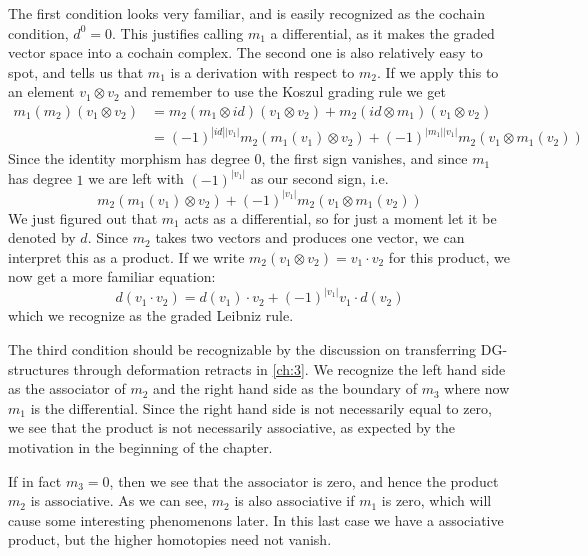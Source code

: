 The first condition looks very familiar, and is easily recognized as the cochain condition, $d^0=0$. This justifies calling $m_1$ a differential, as it makes the graded vector space into a cochain complex. The second one is also relatively easy to spot, and tells us that $m_1$ is a derivation with respect to $m_2$. If we apply this to an element $v_1\otimes v_2$ and remember to use the Koszul grading rule we get 
\begin{align*}
    m_1(m_2)(v_1 \otimes v_2) 
    &= m_2(m_1\otimes id)(v_1\otimes v_2) + m_2(id\otimes m_1)(v_1\otimes v_2) \\
    &= (-1)^{|id||v_1|}m_2(m_1(v_1)\otimes v_2) + (-1)^{|m_1||v_1|}m_2(v_1\otimes m_1(v_2))
\end{align*}
Since the identity morphism has degree $0$, the first sign vanishes, and since $m_1$ has degree $1$ we are left with $(-1)^{|v_1|}$ as our second sign, i.e.
\begin{equation*}
    m_2(m_1(v_1)\otimes v_2) + (-1)^{|v_1|}m_2(v_1\otimes m_1(v_2))
\end{equation*}
We just figured out that $m_1$ acts as a differential, so for just a moment let it be denoted by $d$. Since $m_2$ takes two vectors and produces one vector, we can interpret this as a product. If we write $m_2(v_1\otimes v_2)=v_1\cdot v_2$ for this product, we now get a more familiar equation:
\begin{equation*}
    d(v_1\cdot v_2) = d(v_1)\cdot v_2 + (-1)^{|v_1|}v_1\cdot d(v_2)
\end{equation*}
which we recognize as the graded Leibniz rule. 

The third condition should be recognizable by the discussion on transferring DG-structures through deformation retracts in \cref{ch:3}. We recognize the left hand side as the associator of $m_2$ and the right hand side as the boundary of $m_3$ where now $m_1$ is the differential. Since the right hand side is not necessarily equal to zero, we see that the product is not necessarily associative, as expected by the motivation in the beginning of the chapter. 

If in fact $m_3 = 0$, then we see that the associator is zero, and hence the product $m_2$ is associative.  As we can see, $m_2$ is also associative if $m_1$ is zero, which will cause some interesting phenomenons later. In this last case we have a associative product, but the higher homotopies need not vanish. 

